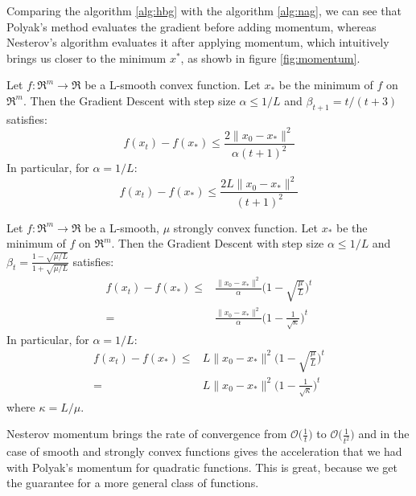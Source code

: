 Comparing the algorithm \ref{alg:hbg} with the algorithm \ref{alg:nag}, we can see that Polyak’s method evaluates the gradient before adding momentum, whereas Nesterov’s algorithm evaluates it after applying momentum, which intuitively brings us closer to the minimum $x^*$, as showb in figure \ref{fig:momentum}.

\begin{theorem} \label{thm:cvx_nag_convergence}
Let $f: \Re^m \rightarrow \Re$ be a L-smooth convex function. Let $x_*$ be the minimum of $f$ on $\Re^m$. Then the Gradient Descent with step size $\alpha \leq 1/L$ and $\beta_{t+1} = t / (t+3)$ satisfies:
$$
f(x_t) - f(x_*) \leq \frac{2 \| x_0 - x_* \|^2}{\alpha (t+1)^2}
$$
In particular, for $\alpha = 1/L$:
$$
f(x_t) - f(x_*) \leq \frac{2L \| x_0 - x_* \|^2}{(t+1)^2}
$$
\end{theorem}

\begin{theorem} \label{thm:str_cvx_nag_convergence}
Let $f: \Re^m \rightarrow \Re$ be a L-smooth, $\mu$ strongly convex function. Let $x_*$ be the minimum of $f$ on $\Re^m$. Then the Gradient Descent with step size $\alpha \leq 1/L$ and $\beta_t = \displaystyle \frac{1 - \sqrt{\mu / L}}{1 + \sqrt{\mu / L}}$ satisfies:
$$
\begin{aligned}
	f(x_t) - f(x_*) \leq & \frac{\| x_0 - x_* \|^2}{\alpha} \Bigg(1 - \sqrt{\frac{\mu}{L}}\Bigg)^t \\ 
						= & \frac{\| x_0 - x_* \|^2}{\alpha} \Bigg(1 - \frac{1}{\sqrt{\kappa}}\Bigg)^t
\end{aligned}
$$
In particular, for $\alpha = 1/L$:
$$
\begin{aligned}
	f(x_t) - f(x_*) \leq & L \| x_0 - x_* \|^2 \Bigg(1 - \sqrt{\frac{\mu}{L}}\Bigg)^t \\
						= & L \| x_0 - x_* \|^2 \Bigg(1 - \frac{1}{\sqrt{\kappa}}\Bigg)^t
\end{aligned}
$$
where $\kappa = L/\mu$.
\end{theorem}

Nesterov momentum brings the rate of convergence from $\displaystyle \mathcal{O}\Big(\frac{1}{t}\Big)$ to $\displaystyle \mathcal{O}\Big(\frac{1}{t^2}\Big)$ and in the case of smooth and strongly convex functions gives the acceleration that we had with Polyak’s momentum for quadratic functions. This is great, because we get the guarantee for a more general class of functions.

